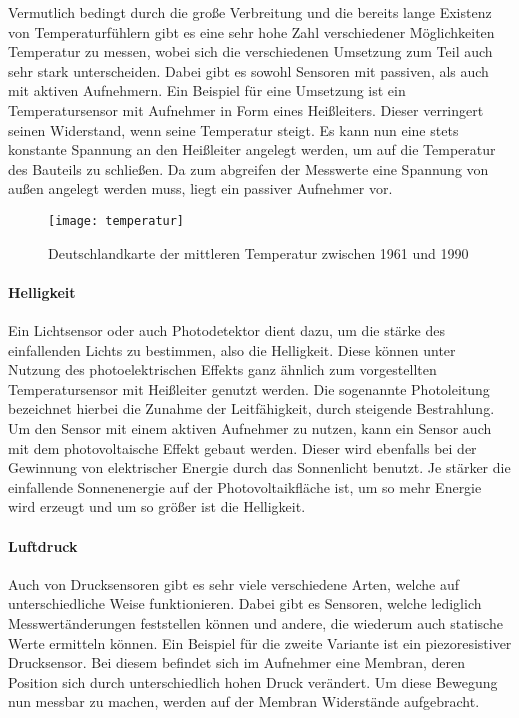Vermutlich bedingt durch die große Verbreitung und die bereits lange Existenz von Temperaturfühlern gibt es eine sehr hohe Zahl verschiedener Möglichkeiten Temperatur zu messen, wobei sich die verschiedenen Umsetzung zum Teil auch sehr stark unterscheiden. Dabei gibt es sowohl Sensoren mit passiven, als auch mit aktiven Aufnehmern.\newline
Ein Beispiel für eine Umsetzung ist ein Temperatursensor mit Aufnehmer in Form eines Heißleiters. Dieser verringert seinen Widerstand, wenn seine Temperatur steigt. Es kann nun eine stets konstante Spannung an den Heißleiter angelegt werden, um auf die Temperatur des Bauteils zu schließen. Da zum abgreifen der Messwerte eine Spannung von außen angelegt werden muss, liegt ein passiver Aufnehmer vor.

\begin{figure}[htbp]
\centering
\caption{Deutschlandkarte der mittleren Temperatur zwischen 1961 und 1990}
\label{fig:temperatur}
\texttt{[image: temperatur]}
\end{figure}

\paragraph{Helligkeit}

Ein Lichtsensor oder auch Photodetektor dient dazu, um die stärke des einfallenden Lichts zu bestimmen, also die Helligkeit. Diese können unter Nutzung des photoelektrischen Effekts ganz ähnlich zum vorgestellten Temperatursensor mit Heißleiter genutzt werden. Die sogenannte Photoleitung bezeichnet hierbei die Zunahme der Leitfähigkeit, durch steigende Bestrahlung. Um den Sensor mit einem aktiven Aufnehmer zu nutzen, kann ein Sensor auch mit dem photovoltaische Effekt gebaut werden. Dieser wird ebenfalls bei der Gewinnung von elektrischer Energie durch das Sonnenlicht benutzt. Je stärker die einfallende Sonnenenergie auf der Photovoltaikfläche ist, um so mehr Energie wird erzeugt und um so größer ist die Helligkeit.

\paragraph{Luftdruck}

Auch von Drucksensoren gibt es sehr viele verschiedene Arten, welche auf unterschiedliche Weise funktionieren. Dabei gibt es Sensoren, welche lediglich Messwertänderungen feststellen können und andere, die wiederum auch statische Werte ermitteln können. Ein Beispiel für die zweite Variante ist ein piezoresistiver Drucksensor. Bei diesem befindet sich im Aufnehmer eine Membran, deren Position sich durch unterschiedlich hohen Druck verändert. Um diese Bewegung nun messbar zu machen, werden auf der Membran Widerstände aufgebracht.

